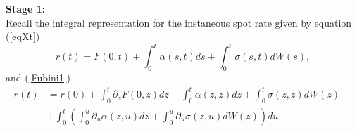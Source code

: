 \begin{demo}\newline
\vskip 0.025cm
\noindent
{\bf Stage 1:}\\
Recall the integral representation for the instaneous spot rate given
by equation (\ref{eqXt})
$$
r(t)=F(0,t)+\int_0^t \alpha(s,t) ds+\int_0^t \sigma(s,t) dW(s),
$$
and (\ref{Fubini1})
\begin{equation}
\label{Fubini2}
\begin{split}
r(t) & = r(0)+\int_0^t \partial_z F(0,z) dz+\int_0^t \alpha(z,z)
dz+\int_0^t \sigma(z,z) dW(z)+\\ 
      &  + \int_0^t  \left( \int_0^u \partial_u \alpha(z,u)
        dz+\int_0^u \partial_u \sigma(z,u) dW(z) \right) du 
\end{split}
\end{equation}


\end{demo}
